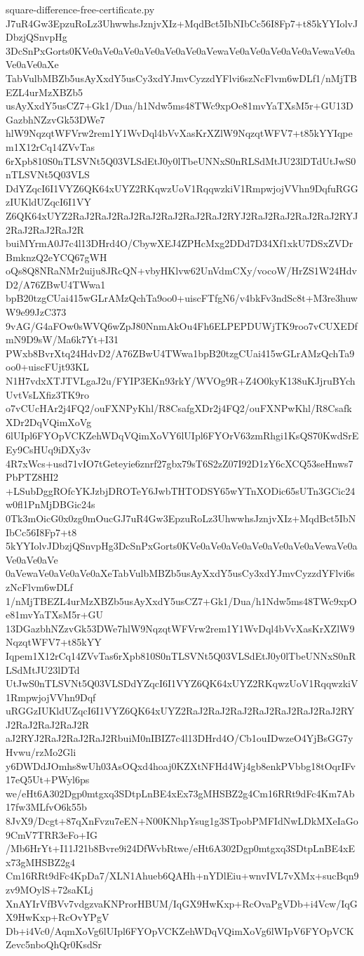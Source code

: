 \documentclass[11pt]{article}
\theoremstyle{definition}
\theoremstyle{remark}
\begin{document}
\begin{filecontents*}[overwrite]{square-difference-free-certificate.py}
J7uR4Gw3EpzuRoLz3UhwwhsJznjvXIz+MqdBct5IbNIbCc56I8Fp7+t85kYYIolvJDbzjQSnvpHg
3DcSnPxGorts0KVe0aVe0aVe0aVe0aVe0aVe0aVewaVe0aVe0aVe0aVe0aVewaVe0aVe0aVe0aXe
TabVulbMBZb5usAyXxdY5usCy3xdYJmvCyzzdYFlvi6szNcFlvm6wDLf1/nMjTBEZL4urMzXBZb5
usAyXxdY5usCZ7+Gk1/Dua/h1Ndw5ms48TWc9xpOe81mvYaTXsM5r+GU13DGazbhNZzvGk53DWe7
hlW9NqzqtWFVrw2rem1Y1WvDql4bVvXasKrXZlW9NqzqtWFV7+t85kYYIqpem1X12rCq14ZVvTas
6rXpb810S0nTLSVNt5Q03VLSdEtJ0y0lTbeUNNxS0nRLSdMtJU23lDTdUtJwS0nTLSVNt5Q03VLS
DdYZqcI6I1VYZ6QK64xUYZ2RKqwzUoV1RqqwzkiV1RmpwjojVVhn9DqfuRGGzIUKldUZqcI6I1VY
Z6QK64xUYZ2RaJ2RaJ2RaJ2RaJ2RaJ2RaJ2RaJ2RYJ2RaJ2RaJ2RaJ2RaJ2RYJ2RaJ2RaJ2RaJ2R
buiMYrmA0J7c4l13DHrd4O/CbywXEJ4ZPHcMxg2DDd7D34Xf1xkU7DSxZVDrBmknzQ2eYCQ67gWH
oQs8Q8NRaNMr2uiju8JRcQN+vbyHKlvw62UnVdmCXy/vocoW/HrZS1W24HdvD2/A76ZBwU4TWwa1
bpB20tzgCUai415wGLrAMzQchTa9oo0+uiscFTfgN6/v4bkFv3ndSc8t+M3re3huwW9e99JzC373
9vAG/G4aFOw0sWVQ6wZpJ80NnmAkOu4Fh6ELPEPDUWjTK9roo7vCUXEDfmN9D9sW/Ma6k7Yt+I31
PWxb8BvrXtq24HdvD2/A76ZBwU4TWwa1bpB20tzgCUai415wGLrAMzQchTa9oo0+uiscFUjt93KL
N1H7vdxXTJTVLgaJ2u/FYIP3EKn93rkY/WVOg9R+Z4O0kyK138uKJjruBYchUvtVsLXfiz3TK9ro
o7vCUcHAr2j4FQ2/ouFXNPyKhl/R8CsafgXDr2j4FQ2/ouFXNPwKhl/R8CsafkXDr2DqVQimXoVg
6lUIpl6FYOpVCKZehWDqVQimXoVY6lUIpl6FYOrV63zmRhgi1KsQS70KwdSrEEy9CsHUq9iDXy3v
4R7xWcs+usd71vIO7tGeteyie6znrf27gbx79sT6S2zZ07I92D1zY6cXCQ53seHnws7PbPTZ8HI2
+LSubDggROfcYKJzbjDROTeY6JwbTHTODSY65wYTnXODic65sUTn3GCic24w0fl1PnMjDBGic24s
0Tk3mOicG0x0zg0mOucGJ7uR4Gw3EpzuRoLz3UhwwhsJznjvXIz+MqdBct5IbNIbCc56I8Fp7+t8
5kYYIolvJDbzjQSnvpHg3DcSnPxGorts0KVe0aVe0aVe0aVe0aVe0aVe0aVewaVe0aVe0aVe0aVe
0aVewaVe0aVe0aVe0aXeTabVulbMBZb5usAyXxdY5usCy3xdYJmvCyzzdYFlvi6szNcFlvm6wDLf
1/nMjTBEZL4urMzXBZb5usAyXxdY5usCZ7+Gk1/Dua/h1Ndw5ms48TWc9xpOe81mvYaTXsM5r+GU
13DGazbhNZzvGk53DWe7hlW9NqzqtWFVrw2rem1Y1WvDql4bVvXasKrXZlW9NqzqtWFV7+t85kYY
Iqpem1X12rCq14ZVvTas6rXpb810S0nTLSVNt5Q03VLSdEtJ0y0lTbeUNNxS0nRLSdMtJU23lDTd
UtJwS0nTLSVNt5Q03VLSDdYZqcI6I1VYZ6QK64xUYZ2RKqwzUoV1RqqwzkiV1RmpwjojVVhn9Dqf
uRGGzIUKldUZqcI6I1VYZ6QK64xUYZ2RaJ2RaJ2RaJ2RaJ2RaJ2RaJ2RaJ2RYJ2RaJ2RaJ2RaJ2R
aJ2RYJ2RaJ2RaJ2RaJ2RbuiM0nIBIZ7c4l13DHrd4O/Cb1ouIDwzeO4YjBsGG7yHvwu/rzMo2Gli
y6DWDdJOmhs8wUh03AsOQxd4hoaj0KZXtNFHd4Wj4gb8enkPVbbg18tOqrIFv17eQ5Ut+PWyl6ps
we/eHt6A302Dgp0mtgxq3SDtpLnBE4xEx73gMHSBZ2g4Cm16RRt9dFc4Km7Ab17fw3MLfvO6k55b
8JvX9/Dcgt+87qXnFvzu7eEN+N00KNhpYsug1g3STpobPMFIdNwLDkMXeIaGo9CmV7TRR3eFo+IG
/Mb6HrYt+I11J21b8Bvre9i24DfWvbRtwe/eHt6A302Dgp0mtgxq3SDtpLnBE4xEx73gMHSBZ2g4
Cm16RRt9dFc4KpDa7/XLN1Ahueb6QAHh+nYDlEiu+wnvIVL7vXMx+sucBqn9zv9MOylS+72saKLj
XnAYIrVfBVv7vdgzvaKNProrHBUM/IqGX9HwKxp+RcOvaPgVDb+i4Vcw/IqGX9HwKxp+RcOvYPgV
Db+i4Vc0/AqmXoVg6lUIpl6FYOpVCKZehWDqVQimXoVg6lWIpV6FYOpVCKZevc5nboQhQr0KsdSr

\end{filecontents*}
\end{document}
